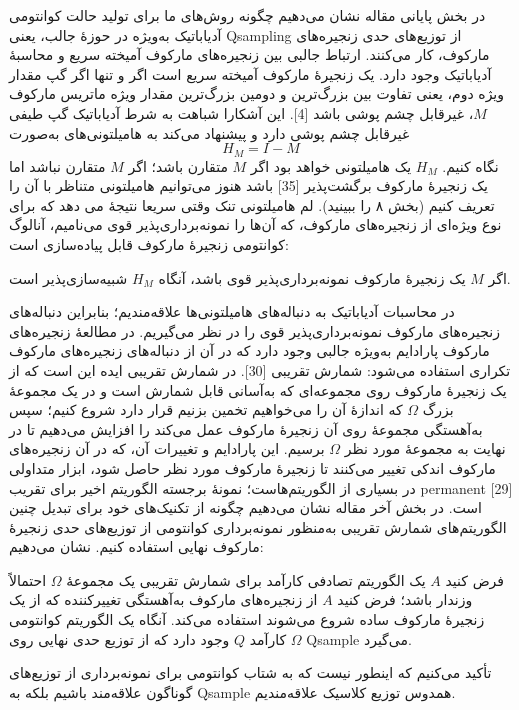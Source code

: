 در بخش پایانی مقاله نشان می‌دهیم چگونه روش‌های ما برای تولید حالت کوانتومی آدیاباتیک به‌ویژه در حوزهٔ جالب، یعنی Qsampling از توزیع‌های حدی زنجیره‌های مارکوف، کار می‌کنند. ارتباط جالبی بین زنجیره‌های مارکوف آمیخته سریع و محاسبهٔ آدیاباتیک وجود دارد. یک زنجیرهٔ مارکوف آمیخته سریع است اگر و تنها اگر گپ مقدار ویژه‌ دوم، یعنی تفاوت بین بزرگ‌ترین و دومین بزرگ‌ترین مقدار ویژه‌ ماتریس مارکوف $M$، غیرقابل چشم پوشی باشد [4]. این آشکارا شباهت به شرط آدیاباتیک گپ طیفی غیرقابل چشم پوشی دارد و پیشنهاد می‌کند به هامیلتونی‌های به‌صورت 
\begin{equation}\label{eq3}
	H_M = I - M
\end{equation}
نگاه کنیم. $H_M$ یک هامیلتونی خواهد بود اگر $M$ متقارن باشد؛ اگر $M$ متقارن نباشد اما یک زنجیرهٔ مارکوف برگشت‌پذیر [35] باشد هنوز می‌توانیم هامیلتونی متناظر با آن را تعریف کنیم (بخش ۸ را ببینید). لم هامیلتونی تنک وقتی سریعا نتیجهٔ می دهد که برای نوع ویژه‌ای از زنجیره‌های مارکوف، که آن‌ها را نمونه‌برداری‌پذیر قوی می‌نامیم، آنالوگ کوانتومی زنجیرهٔ مارکوف قابل پیاده‌سازی است:

\begin{cor}
اگر $M$ یک زنجیرهٔ مارکوف نمونه‌برداری‌پذیر قوی باشد، آنگاه $H_M$ شبیه‌سازی‌پذیر است.
\end{cor}
در محاسبات آدیاباتیک به دنباله‌های هامیلتونی‌ها علاقه‌مندیم؛ بنابراین دنباله‌های زنجیره‌های مارکوف نمونه‌برداری‌پذیر قوی را در نظر می‌گیریم. در مطالعهٔ زنجیره‌های مارکوف پارادایم به‌ویژه جالبی وجود دارد که در آن از دنباله‌های زنجیره‌های مارکوف تکراری استفاده می‌شود: شمارش تقریبی [30]. در شمارش تقریبی ایده این است که از یک زنجیرهٔ مارکوف روی مجموعه‌ای که به‌آسانی قابل شمارش است و در یک مجموعهٔ بزرگ $\Omega$ که اندازهٔ آن را می‌خواهیم تخمین بزنیم قرار دارد شروع کنیم؛ سپس به‌آهستگی مجموعهٔ روی آن زنجیرهٔ مارکوف عمل می‌کند را افزایش می‌دهیم تا در نهایت به مجموعهٔ مورد نظر $\Omega$ برسیم. این پارادایم و تغییرات آن، که در آن زنجیره‌های مارکوف اندکی تغییر می‌کنند تا زنجیرهٔ مارکوف مورد نظر حاصل شود، ابزار متداولی در بسیاری از الگوریتم‌هاست؛ نمونهٔ برجسته الگوریتم اخیر برای تقریب permanent [29] است. در بخش آخر مقاله نشان می‌دهیم چگونه از تکنیک‌های خود برای تبدیل چنین الگوریتم‌های شمارش تقریبی به‌منظور نمونه‌برداری کوانتومی از توزیع‌های حدی زنجیرهٔ مارکوف نهایی استفاده کنیم. نشان می‌دهیم:
\begin{thm}[به‌ تعبیری :]
فرض کنید $A$ یک الگوریتم تصادفی کارآمد برای شمارش تقریبی یک مجموعهٔ $\Omega$ احتمالاً وزندار باشد؛ فرض کنید $A$ از زنجیره‌های مارکوف به‌آهستگی تغییرکننده که از یک زنجیرهٔ مارکوف ساده شروع می‌شوند استفاده می‌کند. آنگاه یک الگوریتم کوانتومی کارآمد $Q$ وجود دارد که از توزیع حدی نهایی روی $\Omega$ Qsample می‌گیرد.
\end{thm}
تأکید می‌کنیم که اینطور نیست که به شتاب کوانتومی برای نمونه‌برداری از توزیع‌های گوناگون علاقه‌مند باشیم بلکه به Qsample همدوس توزیع کلاسیک علاقه‌مندیم.

